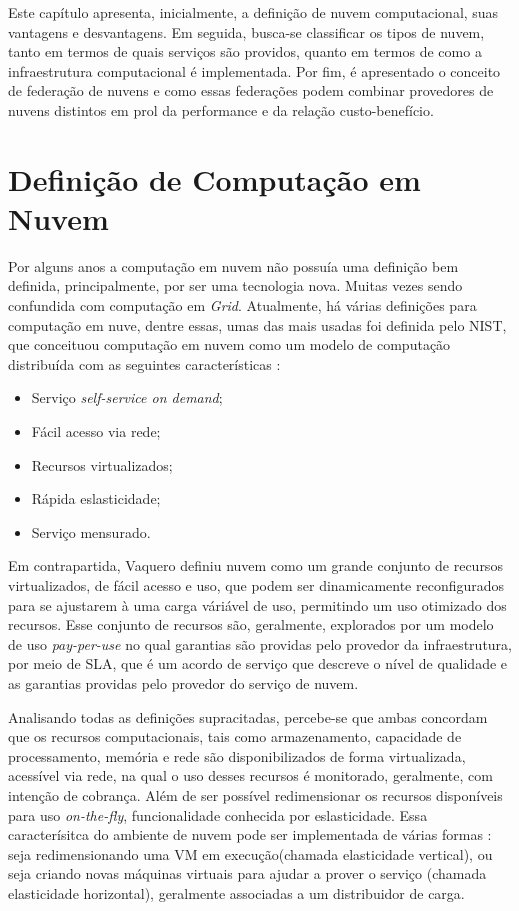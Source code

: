 Este capítulo apresenta, inicialmente, a definição de nuvem computacional, suas vantagens e desvantagens. Em seguida, busca-se classificar os tipos de nuvem, tanto em termos de quais serviços são providos, quanto em termos de como a infraestrutura computacional é implementada. Por fim, é apresentado o conceito de federação de nuvens e como essas federações podem combinar provedores de nuvens distintos em prol da performance e da relação custo-benefício.

\section{Definição de Computação em Nuvem}

Por alguns anos a computação em nuvem não possuía uma definição bem definida, principalmente, por ser uma tecnologia nova. Muitas vezes sendo confundida com computação em \textit{Grid}\cite{Vaquero:2008:BCT:1496091.1496100_Cloud_definition}. Atualmente, há várias definições para computação em nuve, dentre essas, umas das mais usadas foi definida pelo \acrfull{NIST}, que conceituou computação em nuvem como um modelo de computação distribuída com as seguintes características \cite{NIST_CLOUD_DEFINITION}: 
\begin{itemize}
	\item Serviço \textit{self-service on demand};
	\item Fácil acesso via rede;
	\item Recursos virtualizados;
	\item Rápida eslasticidade; 
	\item Serviço mensurado.
\end{itemize}

Em contrapartida, Vaquero\cite{Vaquero:2008:BCT:1496091.1496100_Cloud_definition} definiu nuvem como um grande conjunto de recursos virtualizados, de fácil acesso e uso, que podem ser dinamicamente reconfigurados para se ajustarem à uma carga váriável de uso, permitindo um uso otimizado dos recursos. Esse conjunto de recursos são, geralmente, explorados por um modelo de uso \textit{pay-per-use} no qual garantias são providas pelo provedor da infraestrutura, por meio de \acrfull{SLA}, que é um acordo de serviço que descreve o nível de qualidade e as garantias providas pelo provedor do serviço de nuvem.

Analisando todas as definições supracitadas, percebe-se que ambas concordam que os recursos computacionais, tais como armazenamento, capacidade de processamento, memória e rede são disponibilizados de forma virtualizada, acessível via rede, na qual o uso desses recursos é monitorado, geralmente, com intenção de cobrança. Além de ser possível redimensionar os recursos disponíveis para uso \textit{on-the-fly}, funcionalidade conhecida por eslasticidade. Essa caracterísitca do ambiente de nuvem pode ser implementada de várias formas \cite{Coutinho2015}: seja redimensionando uma \acrfull{VM} em execução(chamada elasticidade vertical), ou seja criando novas máquinas virtuais para ajudar a prover o serviço (chamada elasticidade horizontal), geralmente associadas a um distribuidor de carga.

